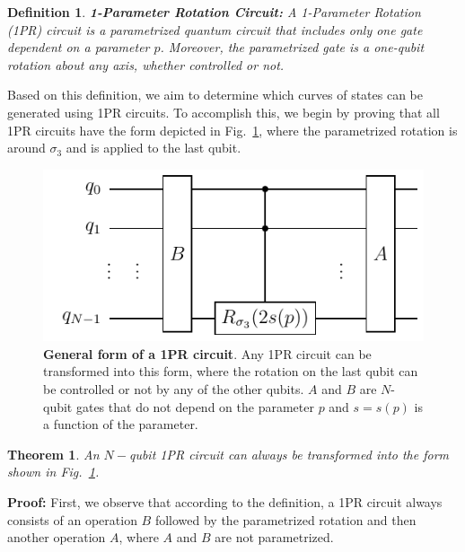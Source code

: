 \documentclass[10pt,letterpaper]{article} %
\newcommand{\fref}[1]{Fig.~\ref{#1}}
\newtheorem{definition}{Definition}
\newtheorem{theorem}{Theorem}
\begin{document}
\begin{definition}{\textbf{1-Parameter Rotation Circuit:}}
A 1-Parameter Rotation (1PR) circuit is a parametrized quantum
circuit that includes only one gate dependent on a parameter $p$.
Moreover, the parametrized gate is a one-qubit rotation about any axis,
whether controlled or not.
\end{definition}

Based on this definition, we aim to determine which curves of 
states can be generated using 1PR  
 circuits. 
To accomplish this, we begin by proving that all 1PR circuits have 
{\color{orange} the form depicted in \fref{fig:1PR-circuit},
where the parametrized rotation is around $\sigma_3$ and
is applied to the last qubit.} 

\begin{figure} %
\centering
\includegraphics{images/OPR-circuit.pdf}
\caption{\textbf{General form of a 1PR circuit}.
Any 1PR circuit can be transformed into this form,
where the rotation on the last qubit
can be controlled or not by any of the other qubits.
$A$ and $B$
are $N$-qubit gates that do not depend on the parameter $p$ and
$s= s(p)$ is a function of the parameter.
 
}
\label{fig:1PR-circuit}
\end{figure} %

\begin{theorem}
An $N-$qubit 1PR circuit can always be transformed 
into the form shown in \fref{fig:1PR-circuit}.
\end{theorem}
\textbf{Proof:} 
First, we observe that according to the
definition, a 1PR circuit always consists of an operation $B$ followed 
by the parametrized rotation and then another operation $A$, 
where $A$ and $B$ are not parametrized.
\end{document}
